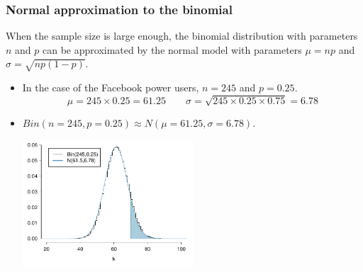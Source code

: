 
\begin{frame}
\frametitle{Normal approximation to the binomial}

When the sample size is large enough, the binomial distribution with parameters $n$ and $p$ can be approximated by the normal model with parameters $\mu = np$ and $\sigma = \sqrt{np(1-p)}$.

\begin{itemize}

\item In the case of the Facebook power users, $n = 245$ and $p = 0.25$.
\[ \mu = 245 \times 0.25 = 61.25 \qquad \sigma = \sqrt{245 \times 0.25 \times 0.75} = 6.78 \]

\item $Bin(n = 245, p = 0.25) \approx N(\mu = 61.25, \sigma = 6.78)$.

\begin{center}
\includegraphics[width=0.5\textwidth]{4-3_binomial_distribution/figures/fb_power_user/fb_power_user}
\end{center}

\end{itemize}

\end{frame}


